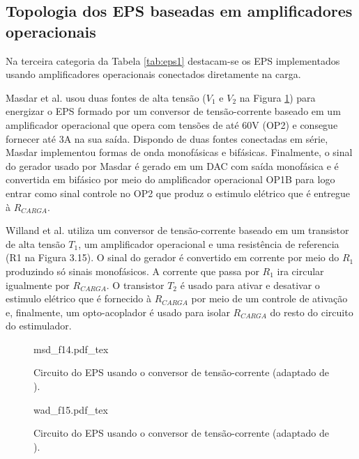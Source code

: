 \subsection*{Topologia dos \acrshort{EPS} baseadas em amplificadores operacionais}
Na terceira categoria da Tabela \ref{tab:eps1} destacam-se os \acrshort{EPS} implementados usando amplificadores operacionais conectados diretamente na carga. 

Masdar et al. \cite{Masdar2013CurrentStimulation} usou duas fontes de alta tensão ($V_{1}$ e $V_{2}$ na Figura \ref{fig:msd_f14}) para energizar o \acrshort{EPS} formado por um conversor de tensão-corrente baseado em um amplificador operacional que opera com tensões de até 60V (OP2) e consegue fornecer até 3A na sua saída. Dispondo de duas fontes conectadas em série, Masdar implementou formas de onda monofásicas e bifásicas. Finalmente, o sinal do gerador usado por Masdar é gerado em um \acrshort{DAC} com saída monofásica e é convertida em bifásico por meio do amplificador operacional OP1B para logo entrar como sinal controle no OP2 que produz o estimulo elétrico que é entregue à $R_{CARGA}$.

Willand et al. \cite{Willand2008DesignFES.} utiliza um conversor de tensão-corrente baseado em um transistor de alta tensão $T_{1}$, um amplificador operacional e uma resistência de referencia (R1 na Figura 3.15). O sinal do gerador é convertido em corrente por meio do $R_{1}$ produzindo só sinais monofásicos. A corrente que passa por $R_{1}$ ira circular igualmente por $R_{CARGA}$. O transistor $T_{2}$ é usado para ativar e desativar o estimulo elétrico que é fornecido à $R_{CARGA}$ por meio de um controle de ativação e, finalmente, um opto-acoplador é usado para isolar $R_{CARGA}$ do resto do circuito do estimulador.

\vspace{0.3cm}

\begin{figure}[h]
    \centering %
    \small %
    \def\svgwidth{0.9
    \columnwidth}%
    {msd_f14.pdf_tex}
    \caption{Circuito do EPS usando o conversor de tensão-corrente (adaptado de \cite{Masdar2012DevelopmentInjuries}).}
    \label{fig:msd_f14}
\end{figure}

\begin{figure}
    \centering %
    \small %
    \def\svgwidth{0.45
    \columnwidth}%
    {wad_f15.pdf_tex}
    \caption{Circuito do EPS usando o conversor de tensão-corrente (adaptado de \cite{Willand2008DesignFES.}).}
    \label{fig:wad_f15}
\end{figure}

